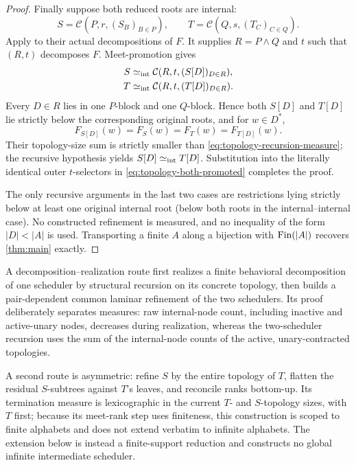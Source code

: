 \begin{proof}
Finally suppose both reduced roots are internal:
\begin{equation}
 S=\mathcal C(P,r,(S_B)_{B\in P}),
 \qquad
 T=\mathcal C(Q,s,(T_C)_{C\in Q}).
 \label{eq:topology-both-internal}
\end{equation}
Apply  to their actual decompositions of
\(F\).  It supplies \(R=P\wedge Q\) and \(t\) such that \((R,t)\) decomposes
\(F\).  Meet-promotion gives
\begin{align}
 S&\mathrel{\simeq_{\mathrm{int}}} \mathcal C(R,t,(S[D])_{D\in R}),\notag\\
 T&\mathrel{\simeq_{\mathrm{int}}} \mathcal C(R,t,(T[D])_{D\in R}).
 \label{eq:topology-both-promoted}
\end{align}
Every \(D\in R\) lies in one \(P\)-block and one \(Q\)-block.  Hence both
\(S[D]\) and \(T[D]\) lie strictly below the corresponding original roots,
and for \(w\in D^*\),
\[
 F_{S[D]}(w)=F_S(w)=F_T(w)=F_{T[D]}(w).
\]
Their topology-size sum is strictly smaller than
\eqref{eq:topology-recursion-measure}; the recursive hypothesis yields
\(S[D]\mathrel{\simeq_{\mathrm{int}}} T[D]\).  Substitution into the literally identical outer
\(t\)-selectors in \eqref{eq:topology-both-promoted} completes the proof.

The only recursive arguments in the last two cases are restrictions lying
strictly below at least one original internal root (below both roots in the
internal--internal case).  No constructed refinement is measured, and no
inequality of the form \(|D|<|A|\) is used.  Transporting a finite \(A\) along
a bijection with \(\operatorname{Fin}(|A|)\) recovers \autoref{thm:main} exactly.
\end{proof}

\begin{remark}
\label{rem:alternative-no-induction}
A decomposition--realization route first realizes a finite behavioral
decomposition of one scheduler by structural recursion on its concrete
topology, then builds a pair-dependent common laminar refinement of the two
schedulers.  Its proof deliberately separates measures: raw internal-node count,
including inactive and active-unary nodes, decreases during realization,
whereas the two-scheduler recursion uses the sum of the internal-node counts
of the active, unary-contracted topologies.

A second route is asymmetric: refine \(S\) by the entire topology of \(T\),
flatten the residual \(S\)-subtrees against \(T\)'s leaves, and reconcile
ranks bottom-up.  Its termination measure is lexicographic in the current
\(T\)- and \(S\)-topology sizes, with \(T\) first; because its meet-rank step
uses finiteness, this construction is scoped to finite alphabets and does not
extend verbatim to infinite alphabets.  The extension below is instead a
finite-support reduction and constructs no global infinite intermediate
scheduler.
\end{remark}


